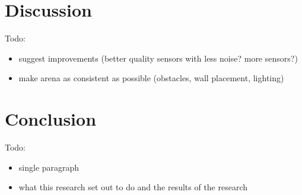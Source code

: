 \documentclass[a4paper,12pt,twocolumn]{article}
\begin{document}

\section{Discussion}

Todo:
\begin{itemize}
    \item suggest improvements (better quality sensors with less noise? more sensors?)
    \item make arena as consistent as possible (obstacles, wall placement, lighting)
\end{itemize}


\section{Conclusion}

Todo:
\begin{itemize}
    \item single paragraph
    \item what this research set out to do and the results of the research
\end{itemize}



\end{document}
